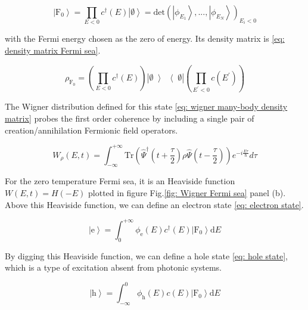 \begin{equation}
\left|\mathrm{F}_{0}\right> = \prod_{E < 0}^{}c^{\dagger}\left(E\right)\left|\emptyset\right> = \mathrm{det}\left(\left|\phi_{E_{1}}\right>,...,\left|\phi_{E_{N}}\right>\right)_{E_{i}<0} \label{eq: wavefunction Fermi sea}
\end{equation}

with the Fermi energy chosen as the zero of energy. Its density matrix is \eqref{eq: density matrix Fermi sea}.

\begin{equation}
\rho_{\mathrm{F}_{0}} = \left(\prod_{E<0}^{}c^{\dagger}\left(E\right)\right)\left|\emptyset\left>\right<\emptyset\right|\left(\prod_{E^{\prime}<0}^{}c\left(E^{\prime}\right)\right) \label{eq: density matrix Fermi sea}
\end{equation}

The Wigner distribution defined for this state \eqref{eq: wigner many-body density matrix} probes the first order coherence by including a single pair of creation/annihilation Fermionic field operators.

\begin{equation}
W_{\rho}\left(E,t\right) = \int_{-\infty}^{+\infty} \mathrm{Tr}\left(\hat{\Psi}^{\dag}\left(t+\frac{\tau}{2}\right)\rho\hat{\Psi}\left(t-\frac{\tau}{2}\right)\right)e^{-i\frac{E\tau}{\hbar}}d\tau \label{eq: wigner many-body density matrix}
\end{equation}

For the zero temperature Fermi sea, it is an Heaviside function $W(E,t) = H(-E)$ plotted in figure Fig.\ref{fig: Wigner Fermi sea} panel (b).
Above this Heaviside function, we can define an electron state \eqref{eq: electron state}.

\begin{equation}
\left|\mathrm{e}\right> = \int_{0}^{+\infty}\phi_{\mathrm{e}}\left(E\right)c^{\dagger}\left(E\right)\left|\mathrm{F}_{0}\right>\mathrm{d}E \label{eq: electron state}
\end{equation}

By digging this Heaviside function, we can define a hole state \eqref{eq: hole state}, which is a type of excitation absent from photonic systems.

\begin{equation}
\left|\mathrm{h}\right> = \int_{-\infty}^{0}\phi_{\mathrm{h}}\left(E\right)c\left(E\right)\left|\mathrm{F}_{0}\right>\mathrm{d}E \label{eq: hole state}
\end{equation}

